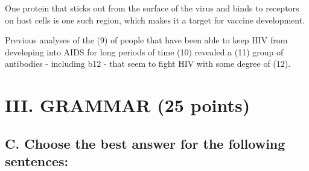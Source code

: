 \documentclass[11pt,a4paper]{article}
\begin{document}
One protein that sticks out from the surface of the virus and binds to receptors on host cells is one such region, which makes it a target for vaccine development.

Previous analyses of the \underline{\hspace{2cm}} (9) of people that have been able to keep HIV from developing into AIDS for long periods of time \underline{\hspace{2cm}} (10) revealed a \underline{\hspace{2cm}} (11) group of antibodies - including b12 - that seem to fight HIV with some degree of \underline{\hspace{2cm}} (12).

\vspace{0.5cm}

\section{III. GRAMMAR (25 points)}

\subsection{C. Choose the best answer for the following sentences:}
\end{document}
